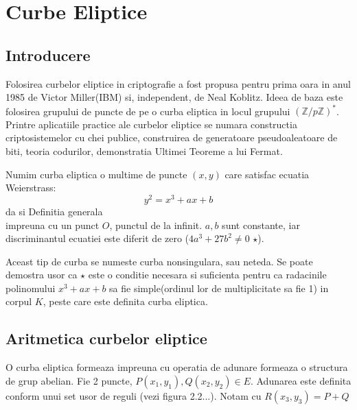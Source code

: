 \chapter{Curbe Eliptice} 
\section{Introducere}
\label{sec:sec01}
Folosirea curbelor eliptice in criptografie a fost propusa pentru prima oara in anul 1985 de Victor Miller(IBM) si, independent, de Neal Koblitz. Ideea de baza este folosirea grupului de puncte de pe o curba eliptica in locul grupului $(\mathbb{Z}/p\mathbb{Z})^{*}$. Printre aplicatiile practice ale curbelor eliptice se numara constructia criptosistemelor cu chei publice, construirea de generatoare pseudoaleatoare de biti, teoria codurilor, demonstratia Ultimei Teoreme a lui Fermat.
\begin{dfn}
Numim curba eliptica o multime de puncte $(x, y)$ care satisfac ecuatia Weierstrass:
$$y^2 = x^3 + ax + b$$ da si Definitia generala
\\impreuna cu un punct $O$, punctul de la infinit. $a, b$ sunt constante, iar discriminantul ecuatiei este diferit de zero ($4a^3+27b^2 \neq 0$ $\star$).
\end{dfn}

Aceast tip de curba se numeste curba nonsingulara, sau neteda. Se poate demostra usor ca $\star$ este o conditie necesara si suficienta pentru ca radacinile polinomului $x^3 + ax + b$ sa fie simple(ordinul lor de multiplicitate sa fie 1) in corpul $K$, peste care este definita curba eliptica.

\section{Aritmetica curbelor eliptice}
\label{sec:sec02}

O curba eliptica formeaza impreuna cu operatia de adunare formeaza o structura de grup abelian. Fie 2 puncte, $P(x_{1}, y_1), Q(x_2, y_2)\in E$. Adunarea este definita conform unui set usor de reguli (vezi figura 2.2...). Notam cu $R(x_3, y_3) = P + Q$

